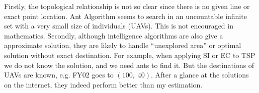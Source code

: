 \documentclass[lang=cn,a4paper,newtx]{elegantpaper}
\begin{document}
Firstly, the topological relationship is not so clear since there is no given line or exact point location.
Ant Algorithm seems to search in an uncountable infinite set with a very small size of individuals (UAVs).
This is not encouraged in mathematics.
Secondly, although intelligence algorithms are also give a approximate solution, they are likely
to handle ``unexplored area'' or optimal solution without exact destination.
For example, when applying SI or EC to TSP we do not know the solution, and we need ants to find it.
But the destinations of UAVs are known, e.g. FY02 goes to $(100,\;40)$.
After a glance at the solutions on the internet, they indeed perform better than my estimation.

\nocite{*}
\printbibliography[heading=bibintoc, title=\ebibname]

\end{document}
